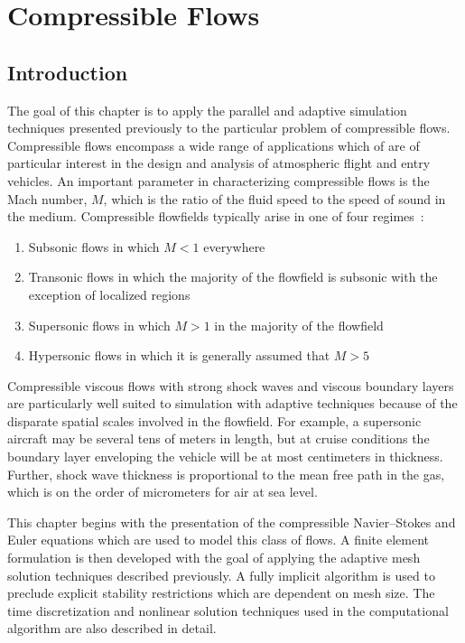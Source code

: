 \chapter{Compressible Flows\label{chap:compressible}}


\section{Introduction}
The goal of this chapter is to apply the parallel and adaptive simulation techniques presented previously to the particular problem of compressible flows.  Compressible flows encompass a wide range of applications which of are of particular interest in the design and analysis of atmospheric flight and entry vehicles. An important parameter in characterizing compressible flows is the Mach number, $M$, which is the ratio of the fluid speed to the speed of sound in the medium.  Compressible flowfields typically arise in one of four regimes~\cite{anderson_compressible,anderson_hypersonic}:
\begin{enumerate}
  \tightlist
  \item Subsonic flows in which $M<1$ everywhere
  \item Transonic flows in which the majority of the flowfield is subsonic with the exception of localized regions
  \item Supersonic flows in which $M>1$ in the majority of the flowfield
  \item Hypersonic flows in which it is generally assumed that $M>5$
\end{enumerate}

Compressible viscous flows with strong shock waves and viscous boundary layers are particularly well suited to simulation with adaptive techniques because of the disparate spatial scales involved in the flowfield.  For example, a supersonic aircraft may be several tens of meters in length, but at cruise conditions the boundary layer enveloping the vehicle will be at most centimeters in thickness.  Further, shock wave thickness is proportional to the mean free path in the gas, which is on the order of micrometers for air at sea level.

This chapter begins with the presentation of the compressible Navier--Stokes and Euler equations which are used to model this class of flows.  A finite element formulation is then developed with the goal of applying the adaptive mesh solution techniques described previously.  A fully implicit algorithm is used to preclude explicit stability restrictions which are dependent on mesh size.  The time discretization and nonlinear solution techniques used in the computational algorithm are also described in detail.

